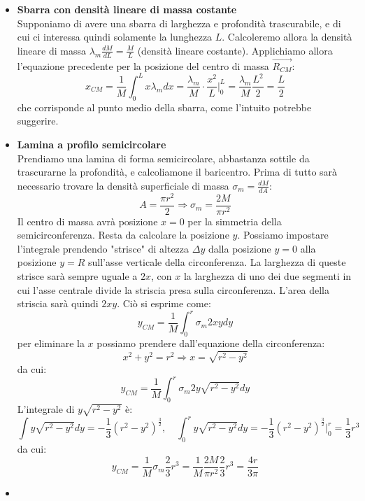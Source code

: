 \documentclass[a4paper,12pt]{article}
\begin{document}
\begin{itemize}
  \item 
    \par\smallskip
    \textbf{Sbarra con densità lineare di massa costante} \\
    Supponiamo di avere una sbarra di larghezza e profondità trascurabile, e di cui ci interessa quindi solamente
    la lunghezza $L$. Calcoleremo allora la densità lineare di massa $\lambda_m\frac{dM}{dL} = \frac{M}{L}$ (densità lineare
    costante). Applichiamo allora l'equazione precedente per la posizione del centro di massa $\vec{R_{CM}}$:
    $$ x_{CM} = \frac{1}{M}\int_0^L x\lambda_m dx = \frac{\lambda_m}{M} \cdot \frac{x^2}{L}\Big|^L_0  = \frac{\lambda_m}{M} \frac{L^2}{2} = \frac{L}{2} $$
    che corrisponde al punto medio della sbarra, come l'intuito potrebbe suggerire.
  \item
    \par\smallskip
    \textbf{Lamina a profilo semicircolare} \\
    Prendiamo una lamina di forma semicircolare, abbastanza sottile da trascurarne la profondità, e calcoliamone
    il baricentro. Prima di tutto sarà necessario trovare la densità superficiale di massa $\sigma_m = \frac{dM}{dA}$:
    $$ A = \frac{\pi r^2}{2} \Rightarrow \sigma_m = \frac{2M}{\pi r^2} $$
    Il centro di massa avrà posizione $x = 0$ per la simmetria della semicirconferenza. Resta da calcolare la posizione $y$.
    Possiamo impostare l'integrale prendendo "strisce" di altezza $\Delta y$ dalla posizione $y = 0$ alla posizione $y = R$
    sull'asse verticale della circonferenza. La larghezza di queste strisce sarà sempre uguale a $2x$, con $x$ la larghezza
    di uno dei due segmenti in cui l'asse centrale divide la striscia presa sulla circonferenza. L'area della striscia sarà
    quindi $2xy$. Ciò si esprime come:
    $$ y_{CM} = \frac{1}{M}\int_0^r \sigma_m 2xydy $$
    per eliminare la $x$ possiamo prendere dall'equazione della circonferenza:
    $$ x^2 + y^2 = r^2 \Rightarrow x = \sqrt{r^2 - y^2} $$
    da cui:
    $$ y_{CM} = \frac{1}{M}\int_0^r \sigma_m 2y\sqrt{r^2 - y^2}dy $$
    L'integrale di $y\sqrt{r^2 - y^2}$ è:
    $$ \int y\sqrt{r^2 - y^2} dy = -\frac{1}{3}(r^2 - y^2)^\frac{3}{2}, \quad \int_0^r y\sqrt{r^2 - y^2} dy = -\frac{1}{3}(r^2 - y^2)^\frac{3}{2} \Big|^r_0 = \frac{1}{3}r^3 $$
    da cui:
    $$ y_{CM} = \frac{1}{M} \sigma_m \frac{2}{3}r^3 = \frac{1}{M}\frac{2M}{\pi r^2} \frac{2}{3}r^3 = \frac{4r}{3\pi} $$
  \item 
    \par\smallskip

\end{itemize}
\end{document}
